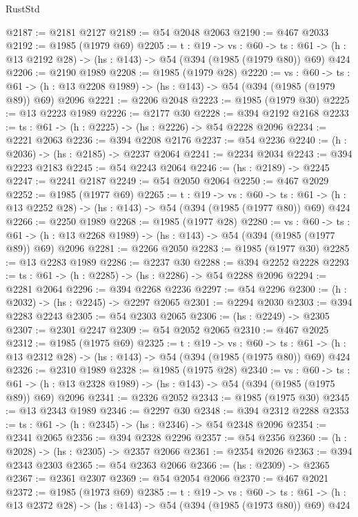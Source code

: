 \begin{lexlean}{RustStd}
\begin{coremodule}
@2187 := @2181 @2127
@2189 := @54 @2048 @2063
@2190 := @467 @2033
@2192 := @1985 (@1979 @69)
@2205 := {t : @19} ->
  {vs : @60} ->
  {ts : @61} -> (h : @13 @2192 @28) -> (hs : @143) -> @54 (@394 (@1985 (@1979 @80)) @69) @424
@2206 := @2190 @1989
@2208 := @1985 (@1979 @28)
@2220 := {vs : @60} ->
  {ts : @61} -> (h : @13 @2208 @1989) -> (hs : @143) -> @54 (@394 (@1985 (@1979 @89)) @69) @2096
@2221 := @2206 @2048
@2223 := @1985 (@1979 @30)
@2225 := @13 @2223 @1989
@2226 := @2177 @30
@2228 := @394 @2192 @2168
@2233 := {ts : @61} -> (h : @2225) -> (hs : @2226) -> @54 @2228 @2096
@2234 := @2221 @2063
@2236 := @394 @2208 @2176
@2237 := @54 @2236
@2240 := (h : @2036) -> (hs : @2185) -> @2237 @2064
@2241 := @2234 @2034
@2243 := @394 @2223 @2183
@2245 := @54 @2243 @2064
@2246 := (hs : @2189) -> @2245
@2247 := @2241 @2187
@2249 := @54 @2050 @2064
@2250 := @467 @2029
@2252 := @1985 (@1977 @69)
@2265 := {t : @19} ->
  {vs : @60} ->
  {ts : @61} -> (h : @13 @2252 @28) -> (hs : @143) -> @54 (@394 (@1985 (@1977 @80)) @69) @424
@2266 := @2250 @1989
@2268 := @1985 (@1977 @28)
@2280 := {vs : @60} ->
  {ts : @61} -> (h : @13 @2268 @1989) -> (hs : @143) -> @54 (@394 (@1985 (@1977 @89)) @69) @2096
@2281 := @2266 @2050
@2283 := @1985 (@1977 @30)
@2285 := @13 @2283 @1989
@2286 := @2237 @30
@2288 := @394 @2252 @2228
@2293 := {ts : @61} -> (h : @2285) -> (hs : @2286) -> @54 @2288 @2096
@2294 := @2281 @2064
@2296 := @394 @2268 @2236
@2297 := @54 @2296
@2300 := (h : @2032) -> (hs : @2245) -> @2297 @2065
@2301 := @2294 @2030
@2303 := @394 @2283 @2243
@2305 := @54 @2303 @2065
@2306 := (hs : @2249) -> @2305
@2307 := @2301 @2247
@2309 := @54 @2052 @2065
@2310 := @467 @2025
@2312 := @1985 (@1975 @69)
@2325 := {t : @19} ->
  {vs : @60} ->
  {ts : @61} -> (h : @13 @2312 @28) -> (hs : @143) -> @54 (@394 (@1985 (@1975 @80)) @69) @424
@2326 := @2310 @1989
@2328 := @1985 (@1975 @28)
@2340 := {vs : @60} ->
  {ts : @61} -> (h : @13 @2328 @1989) -> (hs : @143) -> @54 (@394 (@1985 (@1975 @89)) @69) @2096
@2341 := @2326 @2052
@2343 := @1985 (@1975 @30)
@2345 := @13 @2343 @1989
@2346 := @2297 @30
@2348 := @394 @2312 @2288
@2353 := {ts : @61} -> (h : @2345) -> (hs : @2346) -> @54 @2348 @2096
@2354 := @2341 @2065
@2356 := @394 @2328 @2296
@2357 := @54 @2356
@2360 := (h : @2028) -> (hs : @2305) -> @2357 @2066
@2361 := @2354 @2026
@2363 := @394 @2343 @2303
@2365 := @54 @2363 @2066
@2366 := (hs : @2309) -> @2365
@2367 := @2361 @2307
@2369 := @54 @2054 @2066
@2370 := @467 @2021
@2372 := @1985 (@1973 @69)
@2385 := {t : @19} ->
  {vs : @60} ->
  {ts : @61} -> (h : @13 @2372 @28) -> (hs : @143) -> @54 (@394 (@1985 (@1973 @80)) @69) @424

\end{coremodule}
\end{lexlean}
